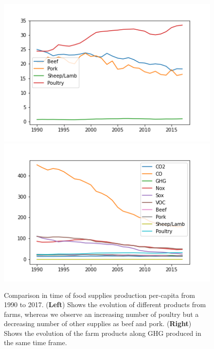 \documentclass[11pt]{article}
\numberwithin{equation}{section}
\begin{document}
\begin{figure}[t]
\centering
\includegraphics[width=0.30\paperwidth, clip=true, trim=0mm 0mm 0mm 0mm]{figures/graph_meat}
\includegraphics[width=0.30\paperwidth, clip=true, trim=0mm 0mm 0mm 0mm]{figures/graph_NEW}

\caption{Comparison in  time of food supplies production per-capita from 1990 to 2017. (\textbf{Left}) Shows the evolution of different products from farms, whereas we observe an increasing number of poultry but a decreasing number of other supplies as beef and pork. (\textbf{Right}) Shows the evolution of the farm products along GHG produced in the same time frame.
}
\label{Example4fig}
\end{figure}
\end{document}

